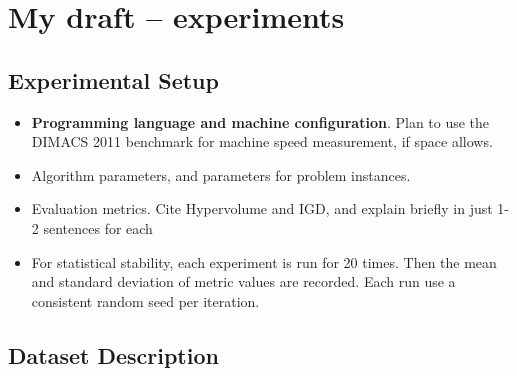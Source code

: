 \documentclass{llncs}
\newcommand{\mycomment}[1]{}
\begin{document}
\mycomment{
UP-NEXT: Experiments
We should re-arrange the below contents to like this (Experiment: HLP benchmarks -- talk both dataset method and exp. set-up, as well as results) (Experiment: Case study -- present dataset methodology, then the settings, then the results) 

4.1 Experimental Set-up (slight modifications)
- Implementation
- Algorithm/ Problem instance parameters
- Performance metric (add cite for HV and IGD)
- Results is averaged from 20 runs, taking mean and stddev value

4.2 Dataset description
Benchmark dataset: Present the method to transform the HLP instances to DRND instances

Central Vietname case study: Present the methodology.

4.3 Experiment 1: Algorithm efficiency 
- Baseline: complete enumeration (can go for branch \& bound approach)
- Proposed: PB-NSGA
- Metrics: HV, IGD, pareto size, algorithm running time.

4.4 Experiment 2: Case study in Vietnam
- Figure: Pareto Front
- Solution visualization on Map
- Insights from the solutions
}

\section{My draft -- experiments}
\subsection{Experimental Setup}
\begin{itemize}
    \item \textbf{Programming language and machine configuration}. Plan to use the DIMACS 2011 benchmark for machine speed measurement, if space allows.
    \item Algorithm parameters, and parameters for problem instances.
    \item Evaluation metrics. Cite Hypervolume and IGD, and explain briefly in just 1-2 sentences for each
    \item For statistical stability, each experiment is run for 20 times. Then the mean and standard deviation of metric values are recorded. Each run use a consistent random seed per iteration.
\end{itemize}

\subsection{Dataset Description}
\end{document}
